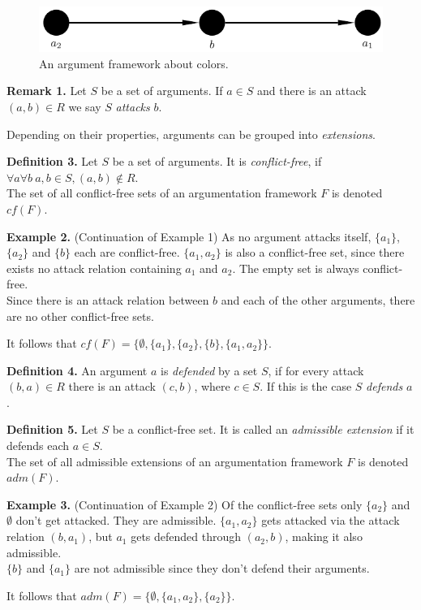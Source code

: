 \documentclass[draft,final]{vutinfth} %
\newcommand{\hl}{\par\medskip}
\newcommand{\dl}{\par\bigskip}
\begin{document}
\FloatBarrier
	\begin{figure}[!htb]
		\centering
		\includegraphics[width=\linewidth]{graphs/ex1.pdf}
		\caption{An argument framework about colors.}
	\end{figure}
\FloatBarrier

\textbf{Remark 1.} Let $S$ be a set of arguments. If $a\in S$ and there is an attack $(a,b)\in R$ we say $S$ \emph{attacks} $b$.\dl

Depending on their properties, arguments can be grouped into \emph{extensions}.\dl

\textbf{Definition 3.} Let $S$ be a set of arguments. It is \emph{conflict-free}, if $\forall a \forall b\ a,b\in S, (a,b)\notin R$.\\
The set of all conflict-free sets of an argumentation framework $F$ is denoted $cf(F)$.\dl

\textbf{Example 2.} (Continuation of Example 1) As no argument attacks itself, $\{a_1\}$, $\{a_2\}$ and $\{b\}$ each are conflict-free. $\{a_1,a_2\}$ is also a conflict-free set, since there exists no attack relation containing $a_1$ and $a_2$. The empty set is always conflict-free.\\
Since there is an attack relation between $b$ and each of the other arguments, there are no other conflict-free sets.\hl
It follows that $cf(F)=\{\emptyset,\{a_1\},\{a_2\},\{b\},\{a_1,a_2\}\}$.\dl

\textbf{Definition 4.} An argument $a$ is \emph{defended} by a set $S$, if for every attack $(b,a)\in R$ there is an attack $(c,b)$, where $c\in S$. If this is the case $S$ \emph{defends} $a$.\dl

\textbf{Definition 5.} Let $S$ be a conflict-free set. It is called an \emph{admissible extension} if it defends each $a\in S$.\\
The set of all admissible extensions of an argumentation framework $F$ is denoted $adm(F)$.\dl

\textbf{Example 3.} (Continuation of Example 2) Of the conflict-free sets only $\{a_2\}$ and \(\emptyset\) don't get attacked. They are admissible. $\{a_1,a_2\}$ gets attacked via the attack relation $(b,a_1)$, but $a_1$ gets defended through $(a_2,b)$, making it also admissible.\\
$\{b\}$ and $\{a_1\}$ are not admissible since they don't defend their arguments.\hl
It follows that $adm(F)=\{\emptyset,\{a_1,a_2\},\{a_2\}\}$.\dl
\end{document}
